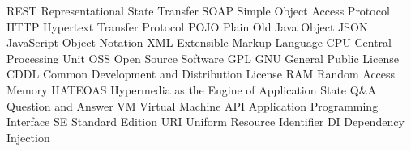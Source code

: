 		{REST}		{Representational State Transfer}
		{SOAP}		{Simple Object Access Protocol}
		{HTTP}		{Hypertext Transfer Protocol}
		{POJO}		{Plain Old Java Object}
		{JSON}		{JavaScript Object Notation}
		{XML}		{Extensible Markup Language}
		{CPU}		{Central Processing Unit}
		{OSS}		{Open Source Software}
		{GPL}		{GNU General Public License}
		{CDDL}		{Common Development and Distribution License}
		{RAM}		{Random Access Memory}
	{HATEOAS}	{Hypermedia as the Engine of Application State}
		{Q\&A}		{Question and Answer}
		{VM}		{Virtual Machine}
		{API}		{Application Programming Interface}
		{SE}		{Standard Edition}
		{URI}		{Uniform Resource Identifier}
		{DI}		{Dependency Injection}
